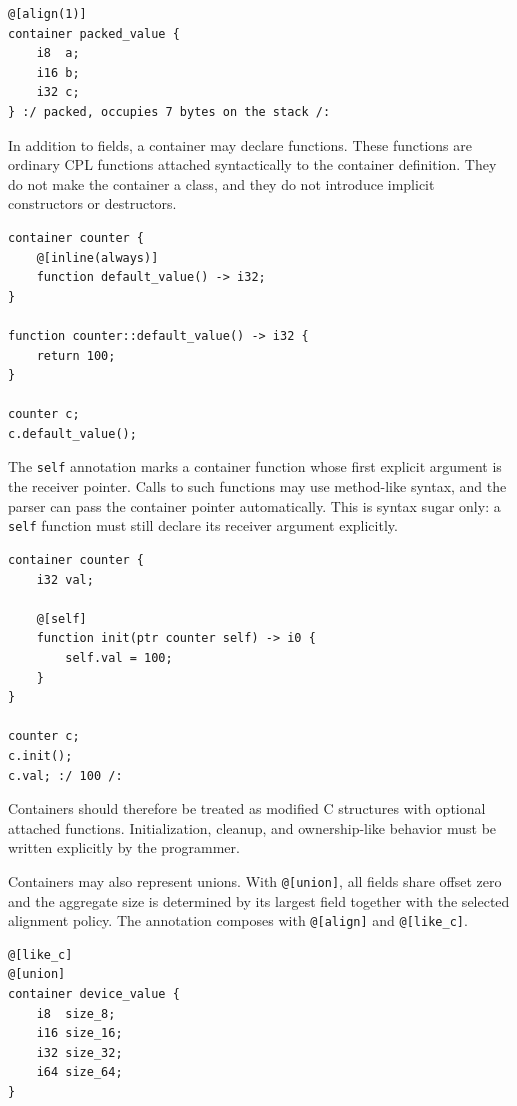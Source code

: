 \documentclass[10pt,twocolumn]{article}
\begin{document}
\begin{lstlisting}[language=CPL,caption={Packed container layout.}]
@[align(1)]
container packed_value {
    i8  a;
    i16 b;
    i32 c;
} :/ packed, occupies 7 bytes on the stack /:
\end{lstlisting}

\par In addition to fields, a container may declare functions. These functions are ordinary CPL functions attached syntactically to the container definition. They do not make the container a class, and they do not introduce implicit constructors or destructors.

\begin{lstlisting}[language=CPL,caption={Container function.}]
container counter {
    @[inline(always)]
    function default_value() -> i32;
}

function counter::default_value() -> i32 {
    return 100;
}

counter c;
c.default_value();
\end{lstlisting}

\par The \texttt{self} annotation marks a container function whose first explicit argument is the receiver pointer. Calls to such functions may use method-like syntax, and the parser can pass the container pointer automatically. This is syntax sugar only: a \texttt{self} function must still declare its receiver argument explicitly.

\begin{lstlisting}[language=CPL,caption={A self container function.}]
container counter {
    i32 val;

    @[self]
    function init(ptr counter self) -> i0 {
        self.val = 100;
    }
}

counter c;
c.init();
c.val; :/ 100 /:
\end{lstlisting}

\par Containers should therefore be treated as modified C structures with optional attached functions. Initialization, cleanup, and ownership-like behavior must be written explicitly by the programmer.
\par Containers may also represent unions. With \texttt{@[union]}, all fields share offset zero and the aggregate size is determined by its largest field together with the selected alignment policy. The annotation composes with \texttt{@[align]} and \texttt{@[like\_c]}.

\begin{lstlisting}[language=CPL,caption={Union container with C-compatible layout.}]
@[like_c]
@[union]
container device_value {
    i8  size_8;
    i16 size_16;
    i32 size_32;
    i64 size_64;
}
\end{lstlisting}
\end{document}
